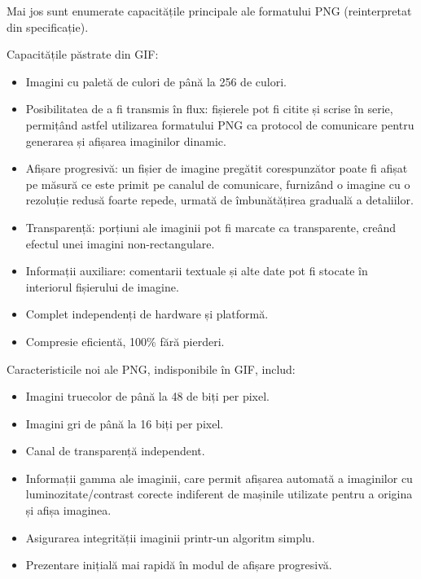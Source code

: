 \documentclass[a4paper,12pt]{report}
\begin{document}
Mai jos sunt enumerate capacitățile principale ale formatului \ac{PNG} (reinterpretat din specificație).

Capacitățile păstrate din GIF:

\begin{itemize}
    \item
        Imagini cu paletă de culori de până la 256 de culori.
        
    \item
        Posibilitatea de a fi transmis în flux:
        fișierele pot fi citite și scrise în serie, permițând astfel utilizarea formatului
        PNG ca protocol de comunicare pentru generarea și afișarea imaginilor dinamic.

    \item
        Afișare progresivă: un fișier de imagine pregătit corespunzător poate fi
        afișat pe măsură ce este primit pe canalul de comunicare,
        furnizând o imagine cu o rezoluție redusă foarte repede,
        urmată de îmbunătățirea graduală a detaliilor.

    \item
        Transparență: porțiuni ale imaginii pot fi marcate ca transparente,
        creând efectul unei imagini non-rectangulare.

    \item 
        Informații auxiliare: comentarii textuale și alte date pot fi
        stocate în interiorul fișierului de imagine.

    \item
        Complet independenți de hardware și platformă.

    \item
        Compresie eficientă, 100\% fără pierderi.
\end{itemize}

Caracteristicile noi ale PNG, indisponibile în GIF, includ:

\begin{itemize}
    \item Imagini truecolor de până la 48 de biți per pixel.

    \item Imagini gri de până la 16 biți per pixel.

    \item Canal de transparență independent.

    \item 
        Informații gamma ale imaginii, care permit afișarea automată a imaginilor
        cu luminozitate/contrast corecte indiferent de mașinile utilizate
        pentru a origina și afișa imaginea.

    \item Asigurarea integrității imaginii printr-un algoritm simplu.

    \item Prezentare inițială mai rapidă în modul de afișare progresivă.
\end{itemize}
\end{document}
